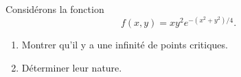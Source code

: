 
\begin{exercice}\label{exoDerrivePartielle-0007}

	Considérons la fonction
	\begin{equation}
		f(x,y)=xy^2 e^{-(x^2+y^2)/4}.
	\end{equation}
	\begin{enumerate}

		\item
			Montrer qu'il y a une infinité de points critiques.
		\item
			Déterminer leur nature.

	\end{enumerate}

\end{exercice}
